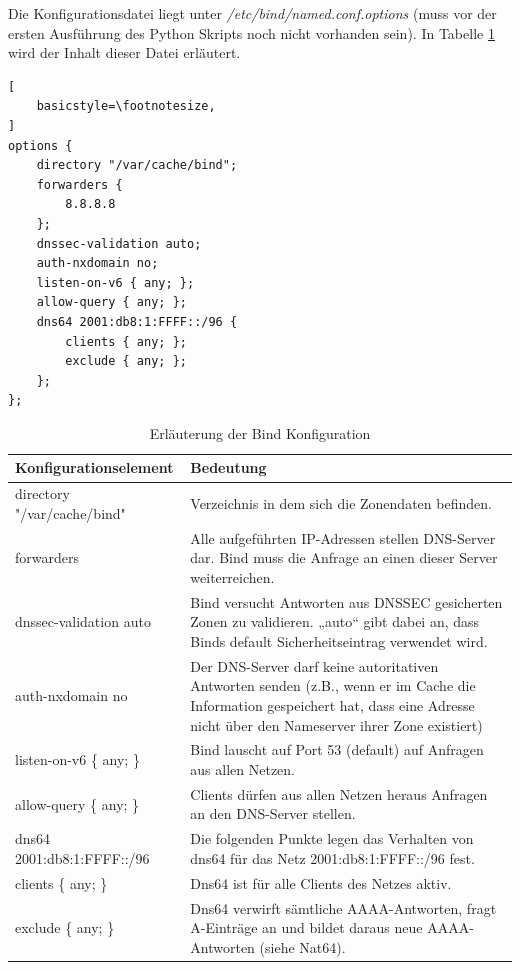 Die Konfigurationsdatei liegt unter \textit{/etc/bind/named.conf.options} (muss vor der ersten Ausführung des Python Skripts noch nicht vorhanden sein). In Tabelle \ref{tab:bindConfig} wird der Inhalt dieser Datei erläutert.
\begin{lstlisting}[
	basicstyle=\footnotesize,
]
options {
	directory "/var/cache/bind";
	forwarders {
		8.8.8.8
	};
	dnssec-validation auto;
	auth-nxdomain no;
	listen-on-v6 { any; };
	allow-query { any; };
	dns64 2001:db8:1:FFFF::/96 {
		clients { any; };
		exclude { any; };
	};
};
\end{lstlisting}

\begin{table}
	\begin{tabular}{lp{9cm}}
		Konfigurationselement & Bedeutung \\ \hline
		directory "/var/cache/bind" & Verzeichnis in dem sich die Zonendaten befinden. \\
		forwarders & Alle aufgeführten IP-Adressen stellen DNS-Server dar. Bind muss die Anfrage an einen dieser Server weiterreichen. \\
		dnssec-validation auto & Bind versucht Antworten aus DNSSEC gesicherten Zonen zu validieren. „auto“ gibt dabei an, dass Binds default Sicherheitseintrag verwendet wird. \\
		auth-nxdomain no & Der DNS-Server darf keine autoritativen Antworten senden (z.B., wenn er im Cache die Information gespeichert hat, dass eine Adresse nicht über den Nameserver ihrer Zone existiert) \\
		listen-on-v6 \{ any; \} & Bind lauscht auf Port 53 (default) auf Anfragen aus allen Netzen. \\
		allow-query \{ any; \} & Clients dürfen aus allen Netzen heraus Anfragen an den DNS-Server stellen. \\
		dns64 2001:db8:1:FFFF::/96 & Die folgenden Punkte legen das Verhalten von dns64 für das Netz 2001:db8:1:FFFF::/96 fest. \\
		clients \{ any; \} & Dns64 ist für alle Clients des Netzes aktiv. \\
		exclude \{ any; \} & Dns64 verwirft sämtliche AAAA-Antworten, fragt A-Einträge an und bildet daraus neue AAAA-Antworten (siehe Nat64). \\
	\end{tabular}
	\caption{Erläuterung der Bind Konfiguration}
	\label{tab:bindConfig}
\end{table}

\FloatBarrier


